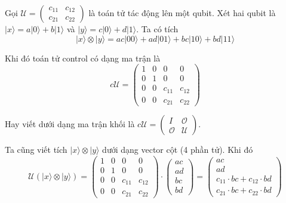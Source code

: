 \begin{definition}    
    Gọi $\mathcal{U} = \begin{pmatrix} c_{11} & c_{12} \\ c_{21} & c_{22} \end{pmatrix}$ là toán tử tác động lên một qubit. Xét hai qubit là $\lvert x \rangle = a \lvert 0 \rangle + b \lvert 1 \rangle$ và $\lvert y \rangle = c \lvert 0 \rangle + d \lvert 1 \rangle$. Ta có tích
    \begin{equation*}
        \lvert x \rangle \otimes \lvert y \rangle = ac \lvert 00 \rangle + ad \lvert 01 \rangle + bc \lvert 10 \rangle + bd \lvert 11 \rangle
    \end{equation*}

    Khi đó toán tử control có dạng ma trận là
    \begin{equation*}
        c \mathcal{U} = \begin{pmatrix} 1 & 0 & 0 & 0 \\ 0 & 1 & 0 & 0 \\ 0 & 0 & c_{11} & c_{12} \\ 0 & 0 & c_{21} & c_{22} \end{pmatrix}
    \end{equation*}

    Hay viết dưới dạng ma trận khối là $c \mathcal{U} = \begin{pmatrix} I & \mathcal{O} \\ \mathcal{O} & \mathcal{U} \end{pmatrix}$.
\end{definition}

Ta cũng viết tích $\lvert x \rangle \otimes \lvert y \rangle$ dưới dạng vector cột (4 phần tử). Khi đó
\begin{equation*}
    \mathcal{U} (\lvert x \rangle \otimes \lvert y \rangle) = \begin{pmatrix} 1 & 0 & 0 & 0 \\ 0 & 1 & 0 & 0 \\ 0 & 0 & c_{11} & c_{12} \\ 0 & 0 & c_{21} & c_{22} \end{pmatrix} \cdot \begin{pmatrix} ac \\ ad \\ bc \\ bd \end{pmatrix} = \begin{pmatrix} ac \\ ad \\ c_{11} \cdot bc + c_{12} \cdot bd \\ c_{21} \cdot bc + c_{22} \cdot bd \end{pmatrix}
\end{equation*}


